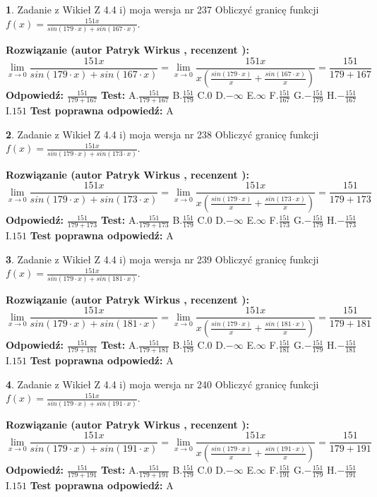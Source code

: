 \documentclass[12pt, a4paper]{article}
\theoremstyle{definition} %
\newtheorem{zad}{}
\newcommand{\zadStart}[1]{\begin{zad}#1\newline}
\newcommand{\zadStop}{\end{zad}}
\newcommand{\rozwStart}[2]{\noindent \textbf{Rozwiązanie (autor #1 , recenzent #2): }\newline}
\newcommand{\rozwStop}{\newline}
\newcommand{\odpStart}{\noindent \textbf{Odpowiedź:}\newline}
\newcommand{\odpStop}{\newline}
\newcommand{\testStart}{\noindent \textbf{Test:}\newline}
\newcommand{\testStop}{\newline}
\newcommand{\kluczStart}{\noindent \textbf{Test poprawna odpowiedź:}\newline}
\newcommand{\kluczStop}{\newline}
\begin{document}
\zadStart{Zadanie z Wikieł Z 4.4 i) moja wersja nr 237}
Obliczyć granicę funkcji $f(x)=\frac{151x}{sin(179\cdot x) +sin(167\cdot x)}$.
\zadStop
\rozwStart{Patryk Wirkus}{}
$$\lim\limits_{x\to 0}\frac{151x}{sin(179\cdot x) +sin(167\cdot x)}=\lim\limits_{x\to 0}\frac{151x}{x(\frac{sin(179\cdot x)}{x}+\frac{sin(167\cdot x)}{x})}=\frac{151}{179+167}$$
\rozwStop
\odpStart
$\frac{151}{179+167}$
\odpStop
\testStart
A.$\frac{151}{179+167}$
B.$\frac{151}{179}$
C.$0$
D.$-\infty$
E.$\infty$
F.$\frac{151}{167}$
G.$-\frac{151}{179}$
H.$-\frac{151}{167}$
I.$151$
\testStop
\kluczStart
A
\kluczStop



\zadStart{Zadanie z Wikieł Z 4.4 i) moja wersja nr 238}
Obliczyć granicę funkcji $f(x)=\frac{151x}{sin(179\cdot x) +sin(173\cdot x)}$.
\zadStop
\rozwStart{Patryk Wirkus}{}
$$\lim\limits_{x\to 0}\frac{151x}{sin(179\cdot x) +sin(173\cdot x)}=\lim\limits_{x\to 0}\frac{151x}{x(\frac{sin(179\cdot x)}{x}+\frac{sin(173\cdot x)}{x})}=\frac{151}{179+173}$$
\rozwStop
\odpStart
$\frac{151}{179+173}$
\odpStop
\testStart
A.$\frac{151}{179+173}$
B.$\frac{151}{179}$
C.$0$
D.$-\infty$
E.$\infty$
F.$\frac{151}{173}$
G.$-\frac{151}{179}$
H.$-\frac{151}{173}$
I.$151$
\testStop
\kluczStart
A
\kluczStop



\zadStart{Zadanie z Wikieł Z 4.4 i) moja wersja nr 239}
Obliczyć granicę funkcji $f(x)=\frac{151x}{sin(179\cdot x) +sin(181\cdot x)}$.
\zadStop
\rozwStart{Patryk Wirkus}{}
$$\lim\limits_{x\to 0}\frac{151x}{sin(179\cdot x) +sin(181\cdot x)}=\lim\limits_{x\to 0}\frac{151x}{x(\frac{sin(179\cdot x)}{x}+\frac{sin(181\cdot x)}{x})}=\frac{151}{179+181}$$
\rozwStop
\odpStart
$\frac{151}{179+181}$
\odpStop
\testStart
A.$\frac{151}{179+181}$
B.$\frac{151}{179}$
C.$0$
D.$-\infty$
E.$\infty$
F.$\frac{151}{181}$
G.$-\frac{151}{179}$
H.$-\frac{151}{181}$
I.$151$
\testStop
\kluczStart
A
\kluczStop



\zadStart{Zadanie z Wikieł Z 4.4 i) moja wersja nr 240}
Obliczyć granicę funkcji $f(x)=\frac{151x}{sin(179\cdot x) +sin(191\cdot x)}$.
\zadStop
\rozwStart{Patryk Wirkus}{}
$$\lim\limits_{x\to 0}\frac{151x}{sin(179\cdot x) +sin(191\cdot x)}=\lim\limits_{x\to 0}\frac{151x}{x(\frac{sin(179\cdot x)}{x}+\frac{sin(191\cdot x)}{x})}=\frac{151}{179+191}$$
\rozwStop
\odpStart
$\frac{151}{179+191}$
\odpStop
\testStart
A.$\frac{151}{179+191}$
B.$\frac{151}{179}$
C.$0$
D.$-\infty$
E.$\infty$
F.$\frac{151}{191}$
G.$-\frac{151}{179}$
H.$-\frac{151}{191}$
I.$151$
\testStop
\kluczStart
A
\kluczStop
\end{document}
